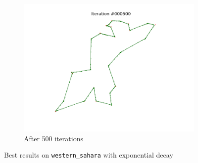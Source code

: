 \documentclass[11pt]{article}
\begin{document}
\begin{figure}
\begin{subfigure}{.33\textwidth}
\end{subfigure}
\begin{subfigure}{.33\textwidth}
  \centering
  \includegraphics[trim={4cm 2cm 4cm 2cm}, clip=true,width=\linewidth]{w_500.png}
  \caption{After 500 iterations}
\end{subfigure}
\caption{Best results on \texttt{western\_sahara} with exponential decay}
\label{fig:bsahara}
\end{figure}
\end{document}
